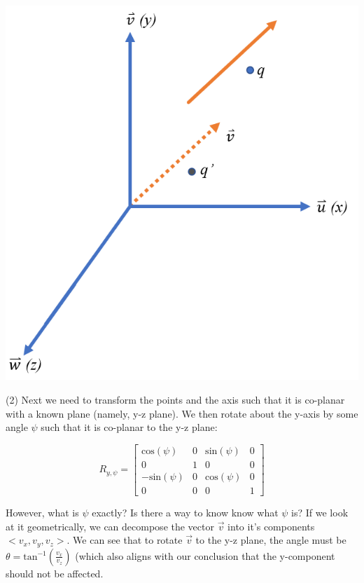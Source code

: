 \documentclass[12pt,letterpaper]{article}
\begin{document}
\begin{center}
\includegraphics[scale=0.75]{rot2}
\end{center}

(2) Next we need to transform the points and the axis such that it is co-planar with a known plane (namely, y-z plane). We then rotate about the y-axis by some angle $\psi$ such that it is co-planar to the y-z plane:

\begin{equation}
    R_{y, \psi} =
     \begin{bmatrix}
        \text{cos}(\psi)  & 0 & \text{sin}(\psi) & 0 \\
        0 & 1 & 0 & 0 \\
        -\text{sin}(\psi) & 0 & \text{cos}(\psi) & 0 \\
        0 & 0 & 0 & 1
    \end{bmatrix}
\end{equation}

However, what is $\psi$ exactly? Is there a way to know know what $\psi$ is? If we look at it geometrically, we can decompose the vector $\overrightarrow{v}$ into it's components $<v_x, v_y, v_z>$. We can see that to rotate $\overrightarrow{v}$ to the y-z plane, the angle must be $\theta=\text{tan}^{-1}(\frac{v_x}{v_z})$ (which also aligns with our conclusion that the y-component should not be affected.
\end{document}
